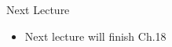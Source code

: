 \documentclass[aspectratio=1610]{beamer}
\begin{document}
%			
%			

\begin{frame}[wide]{Next Lecture}
	\begin{itemize}
		\item Next lecture will finish Ch.18
	\end{itemize}
\end{frame}
\end{document}
